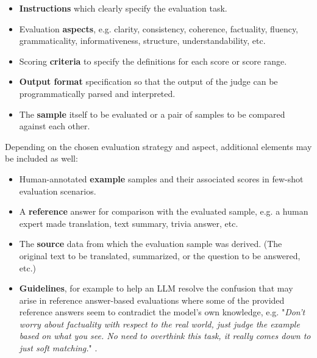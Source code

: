 \documentclass[noindent,nohyp,parspace,titlepage,twoside,12pt]{article}
\begin{document}
        \begin{itemize}
          \item \textbf{Instructions} which clearly specify the evaluation task.

          \item Evaluation \textbf{aspects}, e.g. clarity, consistency,
                coherence, factuality, fluency, grammaticality,
                informativeness, structure, understandability, etc.

          \item Scoring \textbf{criteria} to specify the definitions for each
                score or score range.

          \item \textbf{Output format} specification so that the output of the
                judge can be programmatically parsed and interpreted.

          \item The \textbf{sample} itself to be evaluated or a pair of samples
                to be compared against each other.
        \end{itemize}

        Depending on the chosen evaluation strategy and aspect, additional
        elements may be included as well:

        \begin{itemize}
          \item Human-annotated \textbf{example} samples and their associated
                scores in few-shot evaluation scenarios.

          \item A \textbf{reference} answer for comparison with the evaluated
                sample, e.g. a human expert made translation, text summary,
                trivia answer, etc.

          \item The \textbf{source} data from which the evaluation sample was
                derived. (The original text to be translated, summarized, or
                the question to be answered, etc.)

          \item \textbf{Guidelines}, for example to help an LLM resolve the
                confusion that may arise in reference answer-based evaluations
                where some of the provided reference answers seem to contradict
                the model's own knowledge, e.g. "\emph{Don't worry
                about factuality with respect to the real world, just judge the
                example based on what you see.  No need to overthink this task,
                it really comes down to just soft matching.}" \cite{juries}.
        \end{itemize}
\end{document}
